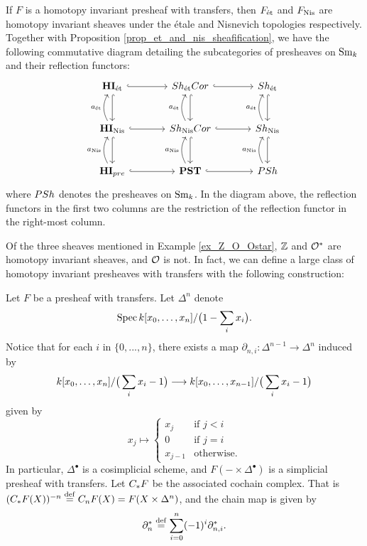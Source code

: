 \begin{rmk}
If $F$ is a homotopy invariant presheaf with transfers, then
$\Etale{F}$ and $\NisSh{F}$ are homotopy invariant sheaves under
the \'etale and Nisnevich topologies respectively. Together with
Proposition \ref{prop_et_and_nis_sheafification}, we have the following
commutative diagram detailing the subcategories of presheaves on
$\Sm$ and their reflection functors:
\[
\begin{tikzcd}[column sep=large, row sep=large]
\HIEt \arrow[hookrightarrow]{r} \arrow[hookrightarrow]{d} &
\ShEtCor \arrow[hookrightarrow]{r} \arrow[hookrightarrow]{d} &
\ShEt \arrow[hookrightarrow]{d} \\
\HINis \arrow[hookrightarrow]{r} \arrow[hookrightarrow]{d} 
\arrow[bend left]{u}{\etale}&
\ShNisCor \arrow[hookrightarrow]{r} \arrow[hookrightarrow]{d} 
\arrow[bend left]{u}{\etale}&
\ShNis \arrow[hookrightarrow]{d} 
\arrow[bend left]{u}{\etale}\\
\HIPST \arrow[hookrightarrow]{r} \arrow[bend left]{u}{\nis} &
\PST \arrow[hookrightarrow]{r} \arrow[bend left]{u}{\nis}&
\PSh \arrow[bend left]{u}{\nis}
\end{tikzcd}
\]
where $\PSh$ denotes the presheaves on $\Sm$. In the diagram
above, the reflection functors in the first two columns
are the restriction of the reflection functor in the right-most
column.
\end{rmk}

Of the three sheaves mentioned in Example \ref{ex_Z_O_Ostar}, $\Z$
and $\Ox$ are homotopy invariant sheaves, and $\O$ is not. In fact,
we can define a large class of homotopy invariant presheaves with
transfers with the following construction:

\begin{constr}\label{constr_suslin_C}
Let $F$ be a presheaf with transfers. Let $\Delta^n$ denote
\[
\Spec \basefield [x_0,\dots,x_n]/\big(1 - \sum_{i} x_i \big).
\]
Notice that for each $i$ in $\{0,...,n\}$, there exists a map 
$\partial_{n, i} : \Delta^{n - 1} \to \Delta^{n}$ induced by
\[
\basefield [x_0,\dots,x_n]/\big(\sum_{i} x_i - 1 \big)
\to \basefield [x_0,\dots,x_{n - 1}]/\big(\sum_{i} x_i - 1 \big)
\]
given by 
\[
x_j \mapsto
\begin{cases}
x_j & \textrm{if }j < i \\
0 & \textrm{if }j = i \\
x_{j - 1} &\textrm{otherwise}.
\end{cases}
\]
In particular, $\Delta^{\bullet}$ is a cosimplicial scheme, and 
$F( - \times \Delta^\bullet)$ is a simplicial presheaf with
transfers. Let $\suslC F$ be the associated cochain complex. That
is $(\suslC F(X))^{-n} \defeq \suslC[n] F(X) = F(X \times 
\Delta^n)$, and the chain map is given by
\[
\partial_{n}^* \defeq \sum_{i = 0}^{n} (-1)^i \partial_{n,i}^*.
\]
\end{constr}

